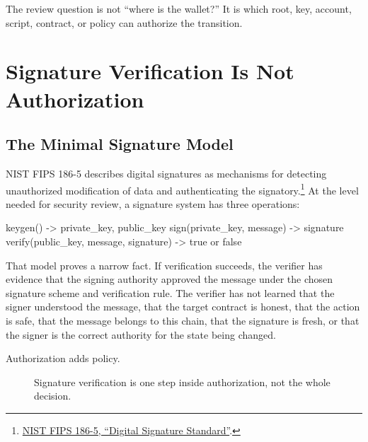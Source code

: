 The review question is not ``where is the wallet?'' It is which root, key, account, script, contract, or policy can authorize the transition.

\section{Signature Verification Is Not Authorization}

\subsection{The Minimal Signature Model}

NIST FIPS 186-5 describes digital signatures as mechanisms for detecting unauthorized modification of data and authenticating the signatory.\footnote{\href{https://nvlpubs.nist.gov/nistpubs/FIPS/NIST.FIPS.186-5.pdf}{NIST FIPS 186-5, ``Digital Signature Standard''}.} At the level needed for security review, a signature system has three operations:

\begin{codeblock}
keygen() -> private_key, public_key
sign(private_key, message) -> signature
verify(public_key, message, signature) -> true or false
\end{codeblock}

That model proves a narrow fact. If verification succeeds, the verifier has evidence that the signing authority approved the message under the chosen signature scheme and verification rule. The verifier has not learned that the signer understood the message, that the target contract is honest, that the action is safe, that the message belongs to this chain, that the signature is fresh, or that the signer is the correct authority for the state being changed.

Authorization adds policy.

\begin{figure}[htbp]
\centering
{}
\caption{Signature verification is one step inside authorization, not the whole decision.}
\end{figure}

